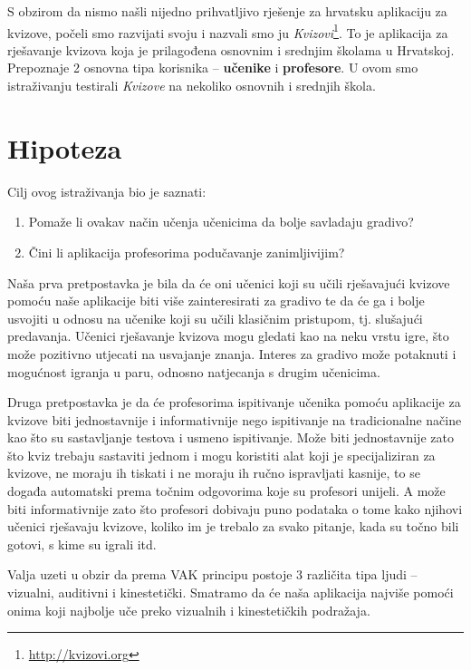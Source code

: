 \documentclass{scrreprt}
\begin{document}
S obzirom da nismo našli nijedno prihvatljivo rješenje za hrvatsku aplikaciju
za kvizove, počeli smo razvijati svoju i nazvali smo ju
\emph{Kvizovi}\footnote{\url{http://kvizovi.org}}. To je aplikacija za
rješavanje kvizova koja je prilagođena osnovnim i srednjim školama u Hrvatskoj.
Prepoznaje 2 osnovna tipa korisnika -- \textbf{učenike} i \textbf{profesore}. U
ovom smo istraživanju testirali \emph{Kvizove} na nekoliko osnovnih i srednjih
škola.

\chapter{Hipoteza}

Cilj ovog istraživanja bio je saznati:

\begin{enumerate}
  \item Pomaže li ovakav način učenja učenicima da bolje savladaju gradivo?
  \item Čini li aplikacija profesorima podučavanje zanimljivijim?
\end{enumerate}

Naša prva pretpostavka je bila da će oni učenici koji su učili rješavajući
kvizove pomoću naše aplikacije biti više zainteresirati za gradivo te da će ga
i bolje usvojiti u odnosu na učenike koji su učili klasičnim pristupom, tj.
slušajući predavanja. Učenici rješavanje kvizova mogu gledati kao na neku vrstu
igre, što može pozitivno utjecati na usvajanje znanja. Interes za gradivo može
potaknuti i mogućnost igranja u paru, odnosno natjecanja s drugim učenicima.

Druga pretpostavka je da će profesorima ispitivanje učenika pomoću aplikacije za
kvizove biti jednostavnije i informativnije nego ispitivanje na tradicionalne
načine kao što su sastavljanje testova i usmeno ispitivanje. Može biti
jednostavnije zato što kviz trebaju sastaviti jednom i mogu koristiti alat koji
je specijaliziran za kvizove, ne moraju ih tiskati i ne moraju ih ručno
ispravljati kasnije, to se događa automatski prema točnim odgovorima koje su
profesori unijeli. A može biti informativnije zato što profesori dobivaju puno
podataka o tome kako njihovi učenici rješavaju kvizove, koliko im je trebalo za
svako pitanje, kada su točno bili gotovi, s kime su igrali itd.

Valja uzeti u obzir da prema VAK principu postoje 3 različita tipa ljudi --
vizualni, auditivni i kinestetički.\cite{clark11} Smatramo da će naša aplikacija
najviše pomoći onima koji najbolje uče preko vizualnih i kinestetičkih
podražaja.
\end{document}
